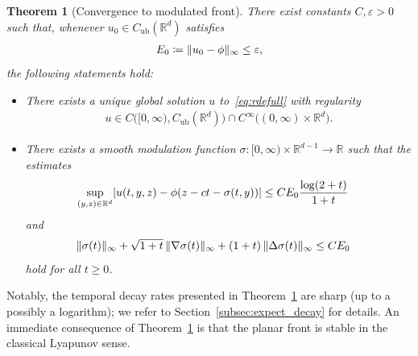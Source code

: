 \documentclass[12pt,oneside,a4paper,reqno]{amsart}
\numberwithin{equation}{section}
\newtheorem{theorem}{Theorem}[section]
\theoremstyle{definition}
\theoremstyle{remark}
\newcommand{\bbR}{{\mathbb R}}
\newcommand{\eps}{\varepsilon}
\newcommand{\Cub}{{C_{\mathrm{ub}}}}
\DeclarePairedDelimiter{\abs}{\lvert}{\rvert}
\DeclarePairedDelimiter{\norm}{\lVert}{\rVert}
\begin{document}
\begin{theorem}[Convergence to modulated front]
	\label{thm:main}
	There exist constants $C,\eps > 0$ such that, whenever $u_0 \in \Cub(\bbR^d)$ satisfies
    \begin{align} \label{eq:E0ineq}
    E_0 \coloneq \norm{u_0 - \phi}_{\infty} \leq \eps,
   \end{align}
   the following statements hold:
   \begin{itemize}
        \item There exists a unique global solution $u$ to~\eqref{eq:rdefull} with regularity
        \begin{align} \label{eq:soluglobal}
        u \in C\big([0,\infty),\Cub(\bbR^d)\big) \cap C^\infty\big((0,\infty) \times \bbR^d\big).
        \end{align}
        \item There exists a smooth modulation function $\sigma \colon [0,\infty) \times \bbR^{d-1} \to \bbR$ such that the estimates
        \begin{align}
            \label{eq:thmest4}
    		\sup_{(y,z) \in \bbR^d} \abs{u(t,y,z) - \phi(z - ct - \sigma(t,y))} &\leq C E_0 \frac{\log(2+t)}{1+t}
        \end{align}
        and
        \begin{align}       
            \label{eq:thmest1}
    		\norm{\sigma(t)}_\infty + \sqrt{1+t}\, \norm{\nabla \sigma(t)}_\infty + (1+t)\, \norm{\Delta \sigma(t)}_\infty &\leq CE_0
        \end{align}
        hold for all $t \geq 0$.
    \end{itemize}
\end{theorem}

Notably, the temporal decay rates presented in Theorem~\ref{thm:main} are sharp (up to a possibly a logarithm); we refer to Section~\ref{subsec:expect_decay} for details. An immediate consequence of Theorem~\ref{thm:main} is that the planar front is stable in the classical Lyapunov sense.
\end{document}
